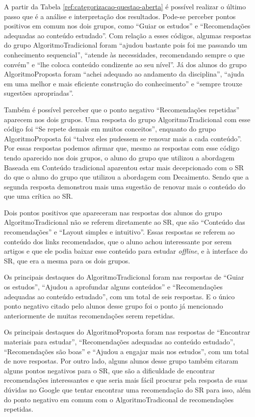 A partir da Tabela \ref{ref:categorizacao-questao-aberta} é possível realizar o último passo que é a análise e interpretação
dos resultados. Pode-se perceber pontos positivos em comum nos dois grupos, como ``Guiar os estudos'' e
``Recomendações adequadas ao conteúdo estudado''. Com relação a esses códigos, algumas respostas do grupo
AlgoritmoTradicional foram ``ajudou bastante pois foi me passando um conhecimento sequencial'',
``atende às necessidades, recomendando sempre o que convém'' e ``lhe coloca conteúdo condizente ao seu nível''.
Já dos alunos do grupo AlgoritmoProposta foram ``achei adequado ao andamento da disciplina'',
``ajuda em uma melhor e mais eficiente construção do conhecimento'' e ``sempre trouxe sugestões apropriadas''.

Também é possível perceber que o ponto negativo ``Recomendações repetidas'' aparecem nos dois grupos. Uma resposta do grupo
AlgoritmoTradicional com esse código foi ``Se repete demais em muitos conceitos'', enquanto do grupo AlgoritmoProposta
foi ``talvez eles pudessem se renovar mais a cada conteúdo''. Por essas respostas podemos afirmar que, mesmo
as respostas com esse código tendo aparecido nos dois grupos, o aluno do grupo que utilizou a abordagem Baseada em Conteúdo
tradicional aparentou estar mais decepcionado com o SR do que o aluno do grupo que utilizou a abordagem com Decaimento.
Sendo que a segunda resposta demonstrou mais uma sugestão de renovar mais o conteúdo do que uma crítica ao SR.

Dois pontos positivos que apareceram nas respostas dos alunos do grupo AlgoritmoTradicional não se referem diretamente
ao SR, que são ``Conteúdo das recomendações'' e ``Layout simples e intuitivo''. Essas respostas se referem ao conteúdo
dos links recomendados, que o aluno achou interessante por serem artigos e que ele podia baixar esse conteúdo para estudar
\textit{offline}, e à interface do SR, que era a mesma para os dois grupos.

Os principais destaques do AlgoritmoTradicional foram nas respostas de ``Guiar os estudos'',
``Ajudou a aprofundar alguns conteúdos'' e ``Recomendações adequadas ao conteúdo estudado'',
com um total de seis respostas. E o único ponto negativo citado pelo alunos desse grupo foi o ponto já mencionado
anteriormente de muitas recomendações serem repetidas.

Os principais destaques do AlgoritmoProposta foram nas respostas de ``Encontrar materiais para estudar'',
``Recomendações adequadas ao conteúdo estudado'', ``Recomendações são boas'' e ``Ajudou a engajar mais nos estudos'',
com um total de nove respostas. Por outro lado, alguns alunos desse grupo também citaram alguns pontos negativos para o
SR, que são a dificuldade de encontrar recomendações interessantes e que seria mais fácil procurar pela resposta de
suas dúvidas no Google que tentar encontrar uma recomendação do SR para isso, além do ponto negativo em comum com o
AlgoritmoTradiconal de recomendações repetidas.

